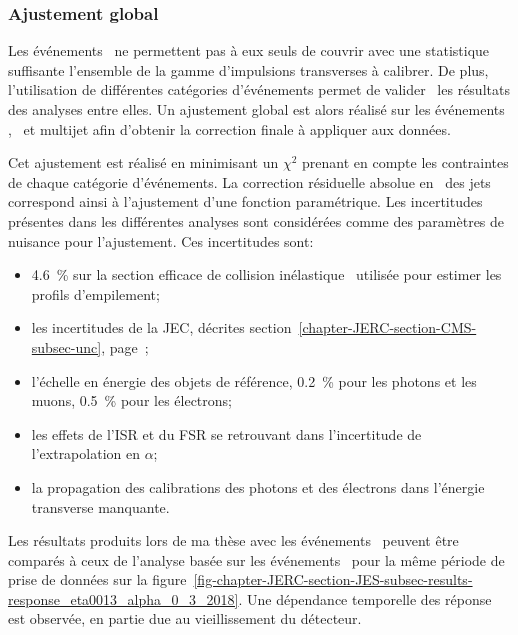 \subsubsection{Ajustement global}\label{chapter-JERC-section-JES-subsec-results-subsubsec-global_fit}
Les événements \Gjets\ ne permettent pas à eux seuls de couvrir avec une statistique suffisante l'ensemble de la gamme d'impulsions transverses à calibrer.
De plus, l'utilisation de différentes catégories d'événements permet de valider \aposteriori\ les résultats des analyses entre elles.
Un ajustement global est alors réalisé sur les événements \Zjets, \Gjets\ et multijet afin d'obtenir la correction finale à appliquer aux données.
\par Cet ajustement est réalisé en minimisant un $\chi^2$ prenant en compte les contraintes de chaque catégorie d'événements.
La correction résiduelle absolue en \pT\ des jets correspond ainsi à l'ajustement d'une fonction paramétrique.
Les incertitudes présentes dans les différentes analyses sont considérées comme des paramètres de nuisance pour l'ajustement. Ces incertitudes sont:
\begin{itemize}
\item \SI{4.6}{\%} sur la section efficace de collision inélastique \proton\proton\ utilisée pour estimer les profils d'empilement;
\item les incertitudes de la JEC, décrites section~\ref{chapter-JERC-section-CMS-subsec-unc}, page~\pageref{chapter-JERC-section-CMS-subsec-unc};
\item l'échelle en énergie des objets de référence, \SI{0.2}{\%} pour les photons et les muons, \SI{0.5}{\%} pour les électrons;
\item les effets de l'ISR et du FSR se retrouvant dans l'incertitude de l'extrapolation en $\alpha$;
\item la propagation des calibrations des photons et des électrons dans l'énergie transverse manquante.
\end{itemize}
\par Les résultats produits lors de ma thèse avec les événements \Gjets\ peuvent être comparés à ceux de l'analyse basée sur les événements \Zmmjets\ pour la même période de prise de données sur la figure~\ref{fig-chapter-JERC-section-JES-subsec-results-response_eta0013_alpha_0_3_2018}.
Une dépendance temporelle des réponse est observée, en partie due au vieillissement du détecteur.
